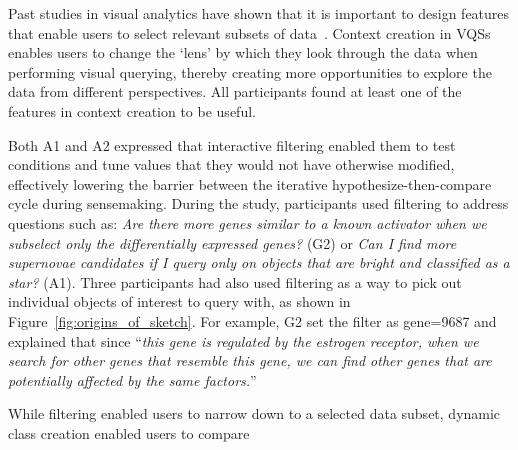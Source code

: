 \par Past studies in visual analytics
have shown that it is important to design features
that enable users to select relevant subsets of data~\cite{Amar2005,Heer2012}.
Context creation in VQSs enables users to change the `lens'
by which they look through the data
when performing visual querying,
thereby creating more opportunities
to explore the data from different perspectives.
All participants found at least
one of the features in context creation to be useful.
\par Both A1 and A2 expressed that
interactive filtering enabled
them to test conditions and tune values
that they would not have otherwise modified,
effectively lowering the barrier between
the iterative hypothesize-then-compare cycle during sensemaking.
During the study, participants used filtering
to address questions such as:
\textit{Are there more genes similar
to a known activator when we subselect
only the differentially expressed genes?} (G2) or \textit{Can I find more supernovae candidates if I query only on objects that are bright and classified as a star?} (A1). Three participants had also used filtering as a way to pick out individual objects of interest to query with, as shown in Figure~\ref{fig:origins_of_sketch}. For example, G2 set the filter as gene=9687 and explained that since ``\textit{this gene is regulated by the estrogen receptor, when we search for other genes that resemble this gene, we can find other genes that are potentially affected by the same factors.}''
\par While filtering enabled users to
narrow down to a selected data subset,
dynamic class creation enabled users to compare
